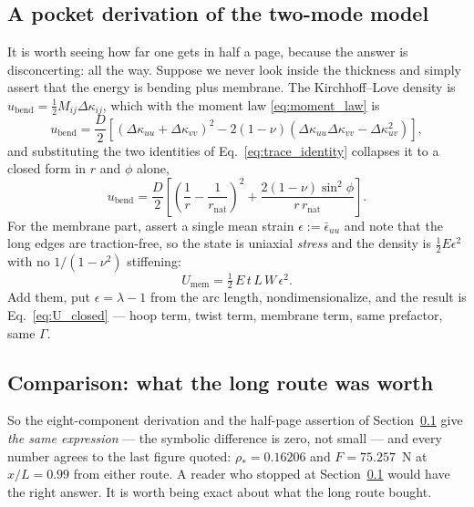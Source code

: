 \documentclass[11pt]{article}
\begin{document}
\subsection{A pocket derivation of the two-mode model}\label{sec:pocket}
It is worth seeing how far one gets in half a page, because the answer is
disconcerting: all the way. Suppose we never look inside the thickness and simply
assert that the energy is bending plus membrane. The Kirchhoff--Love density is
$u_{\mathrm{bend}} = \tfrac12 M_{ij}\Delta\kappa_{ij}$, which with the moment law
\eqref{eq:moment_law} is
\begin{equation}\label{eq:bending_energy_raw}
    u_{\mathrm{bend}} = \frac{D}{2}\left[
      \left(\Delta\kappa_{uu} + \Delta\kappa_{vv}\right)^{2}
      - 2\left(1-\nu\right)\left(\Delta\kappa_{uu}\Delta\kappa_{vv}
        - \Delta\kappa_{uv}^{2}\right)\right],
\end{equation}
and substituting the two identities of Eq.~\eqref{eq:trace_identity} collapses it
to a closed form in $r$ and $\phi$ alone,
\begin{equation}\label{eq:bending_energy}
    u_{\mathrm{bend}} = \frac{D}{2}\left[
      \left(\frac{1}{r} - \frac{1}{r_{\mathrm{nat}}}\right)^{2}
      + \frac{2\left(1-\nu\right)\sin^{2}\phi}{r\,r_{\mathrm{nat}}}\right].
\end{equation}
For the membrane part, assert a single mean strain $\epsilon := \bar\epsilon_{uu}$
and note that the long edges are traction-free, so the state is uniaxial
\emph{stress} and the density is $\tfrac12 E\epsilon^{2}$ with no
$1/\left(1-\nu^{2}\right)$ stiffening:
\begin{equation}\label{eq:U_mem}
    U_{\mathrm{mem}} = \tfrac12\,E\,t\,L\,W\,\epsilon^{2}.
\end{equation}
Add them, put $\epsilon = \lambda - 1$ from the arc length, nondimensionalize,
and the result is Eq.~\eqref{eq:U_closed} --- hoop term, twist term, membrane
term, same prefactor, same $\Gamma$.

\subsection{Comparison: what the long route was worth}\label{sec:comparison}
So the eight-component derivation and the half-page assertion of
Section~\ref{sec:pocket} give \emph{the same expression} --- the symbolic
difference is zero, not small --- and every number agrees to the last figure
quoted: $\rho_{*} = 0.16206$ and $F = 75.257$~N at $x/L = 0.99$ from either
route. A reader who stopped at Section~\ref{sec:pocket} would have the right
answer. It is worth being exact about what the long route bought.
\end{document}

